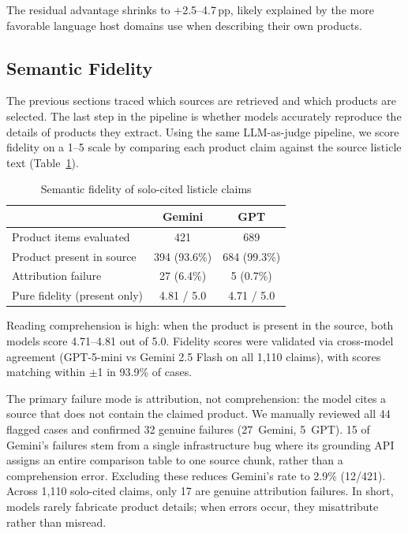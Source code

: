 The residual advantage shrinks to +2.5--4.7\,pp, likely explained by the more favorable language host domains use when describing their own products.

\subsection{Semantic Fidelity}
\label{sec:semantic-fidelity}

The previous sections traced which sources are retrieved and which products are selected. The last step in the pipeline is whether models accurately reproduce the details of products they extract. Using the same LLM-as-judge pipeline, we score fidelity on a 1--5 scale by comparing each product claim against the source listicle text (Table~\ref{tab:semantic-fidelity}).

\begin{table}[H]
\centering
\caption{Semantic fidelity of solo-cited listicle claims}
\label{tab:semantic-fidelity}
\begin{tabular}{lcc}
\toprule
& \textbf{Gemini} & \textbf{GPT} \\
\midrule
Product items evaluated & 421 & 689 \\
Product present in source & 394 (93.6\%) & 684 (99.3\%) \\
Attribution failure & 27 (6.4\%) & 5 (0.7\%) \\
\midrule
Pure fidelity (present only) & 4.81 / 5.0 & 4.71 / 5.0 \\
\bottomrule
\end{tabular}
\end{table}

Reading comprehension is high: when the product is present in the source, both models score 4.71--4.81 out of 5.0. Fidelity scores were validated via cross-model agreement (GPT-5-mini vs Gemini 2.5 Flash on all 1{,}110 claims), with scores matching within $\pm$1 in 93.9\% of cases.

The primary failure mode is attribution, not comprehension: the model cites a source that does not contain the claimed product. We manually reviewed all 44 flagged cases and confirmed 32 genuine failures (27~Gemini, 5~GPT). 15 of Gemini's failures stem from a single infrastructure bug where its grounding API assigns an entire comparison table to one source chunk, rather than a comprehension error. Excluding these reduces Gemini's rate to 2.9\% (12/421). Across 1{,}110 solo-cited claims, only 17 are genuine attribution failures. In short, models rarely fabricate product details; when errors occur, they misattribute rather than misread.
